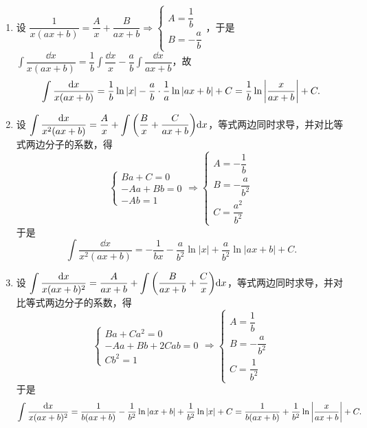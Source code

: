 \begin{enumerate}[label=\arabic{*}.]
\begin{enumerate}[label=\roman{*}.]
\begin{minipage}{0.28\linewidth}
                    \end{minipage}
              \item 设 $\dfrac{1}{x(ax+b)}=\dfrac{A}{x}+\dfrac{B}{ax+b}\Rightarrow \begin{cases}
                            A=\dfrac{1}{b} \\[6pt]B=-\dfrac{a}{b}
                        \end{cases}$，于是 $\displaystyle\int\dfrac{\dd x}{x(ax+b)}=\dfrac{1}{b}\int\dfrac{\dd x}{x}-\dfrac{a}{b}\int\dfrac{\dd x}{ax+b}$，故
                    $$\int\dfrac{\dd x}{x(ax+b)}=\dfrac{1}{b}\ln|x|-\dfrac{a}{b}\cdot\dfrac{1}{a}\ln|ax+b|+C=\dfrac{1}{b}\ln\qty|\dfrac{x}{ax+b}|+C.$$
              \item 设 $\displaystyle\int\dfrac{\dd x}{x^2(ax+b)}=\dfrac{A}{x}+\int\qty(\dfrac{B}{x}+\dfrac{C}{ax+b})\dd x$，等式两边同时求导，并对比等式两边分子的系数，得
                    $$\begin{cases}
                            Ba+C=0 \\-Aa+Bb=0\\-Ab=1
                        \end{cases}\Rightarrow\begin{cases}
                            A=-\dfrac{1}{b} \\[6pt]B=-\dfrac{a}{b^2}\\[6pt]C=\dfrac{a^2}{b^2}
                        \end{cases}$$
                    于是 $$\int\dfrac{\dd x}{x^2(ax+b)}=-\dfrac{1}{bx}-\dfrac{a}{b^2}\ln|x|+\dfrac{a}{b^2}\ln|ax+b|+C.$$
              \item 设 $\displaystyle\int\dfrac{\dd x}{x(ax+b)^2}=\dfrac{A}{ax+b}+\int\qty(\dfrac{B}{ax+b}+\dfrac{C}{x})\dd x$，等式两边同时求导，并对比等式两边分子的系数，得
                    $$\begin{cases}
                            Ba+Ca^2=0 \\-Aa+Bb+2Cab=0\\Cb^2=1
                        \end{cases}\Rightarrow\begin{cases}
                            A=\dfrac{1}{b} \\[6pt]B=-\dfrac{a}{b^2}\\[6pt]C=\dfrac{1}{b^2}
                        \end{cases}$$
                    于是 $$\int\dfrac{\dd x}{x(ax+b)^2}=\dfrac{1}{b(ax+b)}-\dfrac{1}{b^2}\ln|ax+b|+\dfrac{1}{b^2}\ln|x|+C=\dfrac{1}{b(ax+b)}+\dfrac{1}{b^2}\ln\qty|\dfrac{x}{ax+b}|+C.$$

\end{enumerate}
\end{enumerate}
